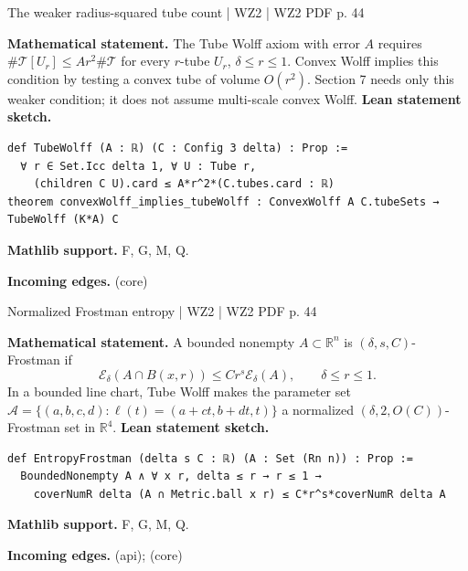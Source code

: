 \documentclass[10pt,a4paper]{article}
\newcommand{\nodecard}[1]{\hyperlink{node-#1}{\texttt{\detokenize{#1}}}}
\begin{document}
\begin{minipage}{\linewidth}
\hypertarget{node-W2TW}{}
\begin{tcolorbox}[colback=white,colframe=cinematicfg,colbacktitle=cinematicbg,coltitle=ink,boxrule=0.45pt,arc=1.6mm,left=3mm,right=3mm,top=2mm,bottom=2mm,title={\sffamily\bfseries WZ2 Section 7: Tube Wolff \hfill \texttt{W2TW}}]
{\sffamily\small\color{muted}The weaker radius-squared tube count | WZ2 | WZ2 PDF p. 44}\par
\textbf{Mathematical statement.} The Tube Wolff axiom with error $A$ requires
$\#\mathcal T[U_r]\le Ar^2\#\mathcal T$ for every $r$-tube $U_r$, $\delta\le r\le1$.
Convex Wolff implies this condition by testing a convex tube of volume $O(r^2)$.
Section 7 needs only this weaker condition; it does not assume multi-scale convex Wolff.
\smallskip\textbf{Lean statement sketch.}
\begin{Verbatim}[fontsize=\small,breaklines=true,breakanywhere=true,tabsize=2]
def TubeWolff (A : ℝ) (C : Config 3 delta) : Prop :=
  ∀ r ∈ Set.Icc delta 1, ∀ U : Tube r,
    (children C U).card ≤ A*r^2*(C.tubes.card : ℝ)
theorem convexWolff_implies_tubeWolff : ConvexWolff A C.tubeSets → TubeWolff (K*A) C
\end{Verbatim}
{\footnotesize\textbf{Mathlib support.} F, G, M, Q.\par
\textbf{Incoming edges.} \nodecard{W2CWA} (core)\par}

\end{tcolorbox}\end{minipage}\par\medskip
\begin{minipage}{\linewidth}
\hypertarget{node-W2DFrost}{}
\begin{tcolorbox}[colback=white,colframe=cinematicfg,colbacktitle=cinematicbg,coltitle=ink,boxrule=0.45pt,arc=1.6mm,left=3mm,right=3mm,top=2mm,bottom=2mm,title={\sffamily\bfseries WZ2 Definition 7.3 \hfill \texttt{W2DFrost}}]
{\sffamily\small\color{muted}Normalized Frostman entropy | WZ2 | WZ2 PDF p. 44}\par
\textbf{Mathematical statement.} A bounded nonempty $A\subset\mathbb R^n$ is $(\delta,s,C)$-Frostman if
\[\mathcal E_\delta(A\cap B(x,r))\le Cr^s\mathcal E_\delta(A),\qquad\delta\le r\le1.\]
In a bounded line chart, Tube Wolff makes the parameter set
$\mathcal A=\{(a,b,c,d):\ell(t)=(a+ct,b+dt,t)\}$ a normalized $(\delta,2,O(C))$-Frostman set in $\mathbb R^4$.
\smallskip\textbf{Lean statement sketch.}
\begin{Verbatim}[fontsize=\small,breaklines=true,breakanywhere=true,tabsize=2]
def EntropyFrostman (delta s C : ℝ) (A : Set (Rn n)) : Prop :=
  BoundedNonempty A ∧ ∀ x r, delta ≤ r → r ≤ 1 →
    coverNumR delta (A ∩ Metric.ball x r) ≤ C*r^s*coverNumR delta A
\end{Verbatim}
{\footnotesize\textbf{Mathlib support.} F, G, M, Q.\par
\textbf{Incoming edges.} \nodecard{Ientropy} (api); \nodecard{W2TW} (core)\par}

\end{tcolorbox}\end{minipage}\par\medskip
\end{document}
